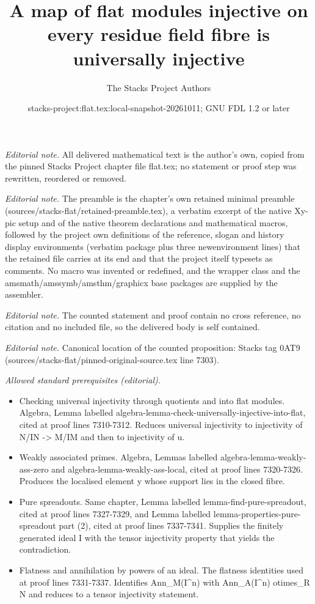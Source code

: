 \documentclass[10pt,a4paper]{amsart}
\title{A map of flat modules injective on every residue field fibre is universally injective}
\author{The Stacks Project Authors}
\date{stacks-project:flat.tex:local-snapshot-20261011; GNU FDL 1.2 or later}
\theoremstyle{plain}
\theoremstyle{definition}
\theoremstyle{remark}
\numberwithin{equation}{subsection}
\begin{document}
\maketitle
\noindent\textit{Editorial note.} All delivered mathematical text is the author's own, copied from the pinned Stacks Project chapter file flat.tex; no statement or proof step was rewritten, reordered or removed.\par\medskip
\noindent\textit{Editorial note.} The preamble is the chapter's own retained minimal preamble (sources/stacks-flat/retained-preamble.tex), a verbatim excerpt of the native Xy-pic setup and of the native theorem declarations and mathematical macros, followed by the project own definitions of the reference, slogan and history display environments (verbatim package plus three newenvironment lines) that the retained file carries at its end and that the project itself typesets as comments. No macro was invented or redefined, and the wrapper class and the amsmath/amssymb/amsthm/graphicx base packages are supplied by the assembler.\par\medskip
\noindent\textit{Editorial note.} The counted statement and proof contain no cross reference, no citation and no included file, so the delivered body is self contained.\par\medskip
\noindent\textit{Editorial note.} Canonical location of the counted proposition: Stacks tag 0AT9 (sources/stacks-flat/pinned-original-source.tex line 7303).\par\medskip
\noindent\textit{Allowed standard prerequisites (editorial).}\begin{itemize}
\item Checking universal injectivity through quotients and into flat modules. Algebra, Lemma labelled algebra-lemma-check-universally-injective-into-flat, cited at proof lines 7310-7312. Reduces universal injectivity to injectivity of N/IN -> M/IM and then to injectivity of u.
\item Weakly associated primes. Algebra, Lemmas labelled algebra-lemma-weakly-ass-zero and algebra-lemma-weakly-ass-local, cited at proof lines 7320-7326. Produces the localised element y whose support lies in the closed fibre.
\item Pure spreadouts. Same chapter, Lemma labelled lemma-find-pure-spreadout, cited at proof lines 7327-7329, and Lemma labelled lemma-properties-pure-spreadout part (2), cited at proof lines 7337-7341. Supplies the finitely generated ideal I with the tensor injectivity property that yields the contradiction.
\item Flatness and annihilation by powers of an ideal. The flatness identities used at proof lines 7331-7337. Identifies Ann\_M(I\textasciicircum{}n) with Ann\_A(I\textasciicircum{}n) otimes\_R N and reduces to a tensor injectivity statement.
\end{itemize}\medskip
\end{document}
